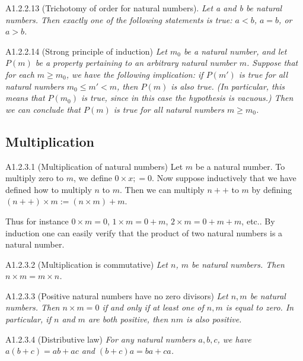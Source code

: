 \begin{proposition}{A1.2.2.13}
    (Trichotomy of order for natural numbers). \emph{Let a and b be natural numbers. Then exactly one of the following statements is true: $a<b$, $a=b$, or $a>b$.}
\end{proposition}

\begin{proposition}{A1.2.2.14}
    (Strong principle of induction) \emph{Let $m_0$ be a natural number, and let $P(m)$ be a property pertaining to an arbitrary natural number $m$. Suppose that for each $m\geq m_0$, we have the following implication: if $P(m')$ is true for all natural numbers $m_0 \leq m' < m$, then $P(m)$ is also true. (In particular, this means that $P(m_0)$ is true, since in this case the hypothesis is vacuous.) Then we can conclude that $P(m)$ is true for all natural numbers $m \geq m_0$.}
\end{proposition}

\subsection{Multiplication}
\begin{definition}{A1.2.3.1}
    (Multiplication of natural numbers) Let $m$ be a natural number. To multiply zero to $m$, we define $0\times x ;= 0$. Now suppose inductively that we have defined how to multiply $n$ to $m$. Then we can multiply $n++$ to $m$ by defining $(n++)\times m := (n\times m) + m$.

    Thus for instance $0 \times m=0$, $1\times m = 0+m$, $2\times m = 0 +  m + m$, etc.. By induction one can easily verify that the product of two natural numbers is a natural number.
\end{definition}

\begin{lemma}{A1.2.3.2}
    (Multiplication is commutative) \emph{Let $n$, $m$ be natural numbers. Then $n\times m = m\times n$.}
\end{lemma}

\begin{lemma}{A1.2.3.3}
    (Positive natural numbers have no zero divisors) \emph{Let $n, m$ be natural numbers. Then $n\times m = 0$ if and only if at least one of $n, m$ is equal to zero. In particular, if $n$ and $m$ are both positive, then $nm$ is also positive.}
\end{lemma}

\begin{lemma}{A1.2.3.4}
    (Distributive law) \emph{For any natural numbers $a,b,c$, we have $a(b+c)=ab+ac$ and $(b+c)a=ba+ca$.}
\end{lemma}

